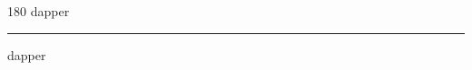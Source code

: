 
\begin{frame}
\begin{center}
\begin{turn}{180}
{\fontsize{2.5cm}{1em}\selectfont dapper}
\end{turn}
\vspace{1em}\par  
\hrule
\vspace{1em}\par  
{\fontsize{2.5cm}{1em}\selectfont dapper}
\end{center}
\end{frame}
